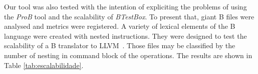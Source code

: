 \documentclass[runningheads]{llncs}
\begin{document}

Our tool was also tested with the intention of expliciting the problems of using the \textit{ProB} tool and the scalability of \textit{BTestBox}. To present that, giant B files were analysed and metrics were registered. A variety of lexical elements of the B language were created with nested instructions. They were designed to test the scalability of a B translator to LLVM~\cite{deharbebtestbox}. Those files may be classified by the number of nesting in command block of the operations. %
The results are shown in Table \ref{tab:escalabilidade}.  
\end{document}
